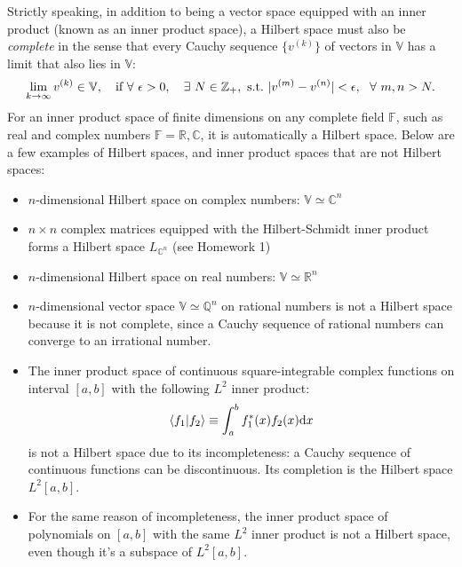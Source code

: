 Strictly speaking, in addition to being a vector space equipped with an inner product (known as an inner product space), a Hilbert space must also be \emph{complete} in the sense that every Cauchy sequence $\{v^{(k)}\}$ of vectors in $\mathbb{V}$ has a limit that also lies in $\mathbb{V}$:
\begin{align}
\lim_{k\rightarrow\infty}v^{(k)}\in\mathbb{V},~~~\text{if}~\forall~\epsilon>0,~~~\exists~N\in{\mathbb{Z}}_+,~\text{s.t.}~|v^{(m)}-v^{(n)}|<\epsilon,~~\forall~m,n>N.
\end{align}
For an inner product space of finite dimensions on any complete field $\mathbb{F}$, such as real and complex numbers $\mathbb{F}=\mathbb{R},\mathbb{C}$, it is automatically a Hilbert space. Below are a few examples of Hilbert spaces, and inner product spaces that are not Hilbert spaces:
\begin{itemize}
    \item $n$-dimensional Hilbert space on complex numbers: $\mathbb{V}\simeq \mathbb{C}^n$
    \item $n\times n$ complex matrices equipped with the Hilbert-Schmidt inner product forms a Hilbert space $L_{\mathbb{C}^n}$ (see Homework 1)
    \item $n$-dimensional Hilbert space on real numbers: $\mathbb{V}\simeq \mathbb{R}^n$
    \item $n$-dimensional vector space $\mathbb{V}\simeq \mathbb{Q}^n$ on rational numbers is not a Hilbert space because it is not complete, since a Cauchy sequence of rational numbers can converge to an irrational number.
    \item The inner product space of continuous square-integrable complex functions on interval $[a,b]$ with the following $L^2$ inner product:
    \begin{align}
   \langle{f_1|f_2}\rangle\equiv\int_a^bf_1^\ast(x)f_2(x)\text{d}x
    \end{align}
    is not a Hilbert space due to its incompleteness: a Cauchy sequence of continuous functions can be discontinuous. Its completion is the Hilbert space $L^2[a,b]$.
    \item For the same reason of incompleteness, the inner product space of polynomials on $[a,b]$ with the same $L^2$ inner product is not a Hilbert space, even though it's a subspace of $L^2[a,b]$.
\end{itemize}

